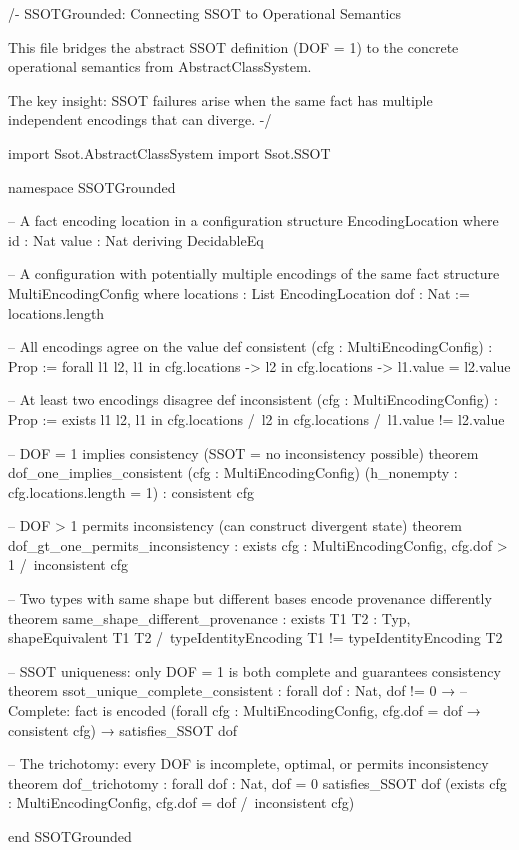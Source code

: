 \begin{code}
/-
  SSOTGrounded: Connecting SSOT to Operational Semantics

  This file bridges the abstract SSOT definition (DOF = 1) to the
  concrete operational semantics from AbstractClassSystem.

  The key insight: SSOT failures arise when the same fact has multiple
  independent encodings that can diverge.
-/

import Ssot.AbstractClassSystem
import Ssot.SSOT

namespace SSOTGrounded

-- A fact encoding location in a configuration
structure EncodingLocation where
  id : Nat
  value : Nat
  deriving DecidableEq

-- A configuration with potentially multiple encodings of the same fact
structure MultiEncodingConfig where
  locations : List EncodingLocation
  dof : Nat := locations.length

-- All encodings agree on the value
def consistent (cfg : MultiEncodingConfig) : Prop :=
  forall l1 l2, l1 in cfg.locations -> l2 in cfg.locations -> l1.value = l2.value

-- At least two encodings disagree
def inconsistent (cfg : MultiEncodingConfig) : Prop :=
  exists l1 l2, l1 in cfg.locations /\
               l2 in cfg.locations /\
               l1.value != l2.value

-- DOF = 1 implies consistency (SSOT = no inconsistency possible)
theorem dof_one_implies_consistent (cfg : MultiEncodingConfig)
    (h_nonempty : cfg.locations.length = 1) : consistent cfg

-- DOF > 1 permits inconsistency (can construct divergent state)
theorem dof_gt_one_permits_inconsistency :
    exists cfg : MultiEncodingConfig, cfg.dof > 1 /\
    inconsistent cfg

-- Two types with same shape but different bases encode provenance differently
theorem same_shape_different_provenance :
    exists T1 T2 : Typ, shapeEquivalent T1 T2 /\
                        typeIdentityEncoding T1 != typeIdentityEncoding T2

-- SSOT uniqueness: only DOF = 1 is both complete and guarantees consistency
theorem ssot_unique_complete_consistent :
    forall dof : Nat,
      dof != 0 →  -- Complete: fact is encoded
      (forall cfg : MultiEncodingConfig, cfg.dof = dof → consistent cfg) →
      satisfies_SSOT dof

-- The trichotomy: every DOF is incomplete, optimal, or permits inconsistency
theorem dof_trichotomy : forall dof : Nat,
    dof = 0 \/ satisfies_SSOT dof \/
    (exists cfg : MultiEncodingConfig, cfg.dof = dof /\
    inconsistent cfg)

end SSOTGrounded
\end{code}

